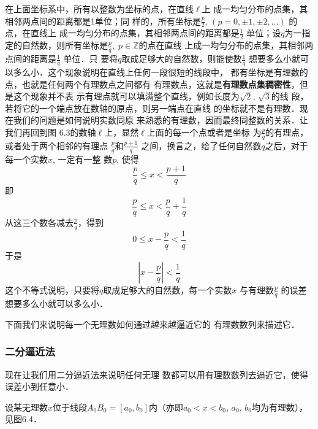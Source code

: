 \begin{figure}[htp]
    \centering
{}
    \caption{}
\end{figure}

在上面坐标系中，所有以整数为坐标的点，在直线$\ell$上
成一均匀分布的点集，其相邻两点间的距离都是1单位；同
样的，所有坐标是$\frac{p}{2}$, $(p=0,\pm1,\pm2,\ldots)$
的点，在直线上
成一均匀分布的点集，其相邻两点间的距离都是$\frac{1}{2}$
单位；设$q$为一指定的自然数，则所有坐标是$\frac{p}{q},\; p\in\mathbb{Z}$的点在直线
上成一均匀分布的点集，其相邻两点间的距离是$\frac{1}{q}$
单位．只
要将$q$取成足够大的自然数，则能使数$\frac{1}{q}$
想要多么小就可
以多么小．这个现象说明在直线上任何一段很短的线段中，
都有坐标是有理数的点，也就是任何两个有理数点之间都有
有理数点，这就是\textbf{有理数点集稠密性}，但是这个现象并不表
示有理点就可以填满整个直线，例如长度为$\sqrt{2}$, $\sqrt{3}$的线
段，若将它的一个端点放在数轴的原点，则另一端点在直线
的坐标就不是有理数．现在我们的问题是如何说明实数同原
来熟悉的有理数，因而最终同整数的关系．让我们再回到图
6.3的数轴$\ell$上，显然$\ell$上面的每一个点或者是坐标
为$\frac{p}{q}$的有理点，或者处于两个相邻的有理点
$\frac{p}{q}$和$\frac{p+1}{q}$
之间，换言之，给了任何自然数$q$之后，对于每一个实数$x$, 一定有一整
数$p$, 使得
\[\frac{p}{q}\le x<\frac{p+1}{q}\]
即
\[\frac{p}{q}\le x<\frac{p}{q}+\frac{1}{q}\]
从这三个数各减去$\frac{p}{q}$，得到
\[0\le x-\frac{p}{q}<\frac{1}{q}\]
于是
\[\left|x-\frac{p}{q}\right|<\frac{1}{q}\]
这个不等式说明，只要将$q$取成足够大的自然数，每一个实数$x$
与有理数$\frac{p}{q}$
的误差想要多么小就可以多么小．

下面我们来说明每一个无理数如何通过越来越逼近它的
有理数数列来描述它．

\subsubsection{二分逼近法}

现在让我们用二分逼近法来说明任何无理
数都可以用有理数数列去逼近它，使得误差小到任意小．

设某无理数$x$位于线段$A_0B_0=[a_0,b_0]$内（亦即$a_0<x<b_0$,
$a_0$, $b_0$均为有理数），见图6.4．

